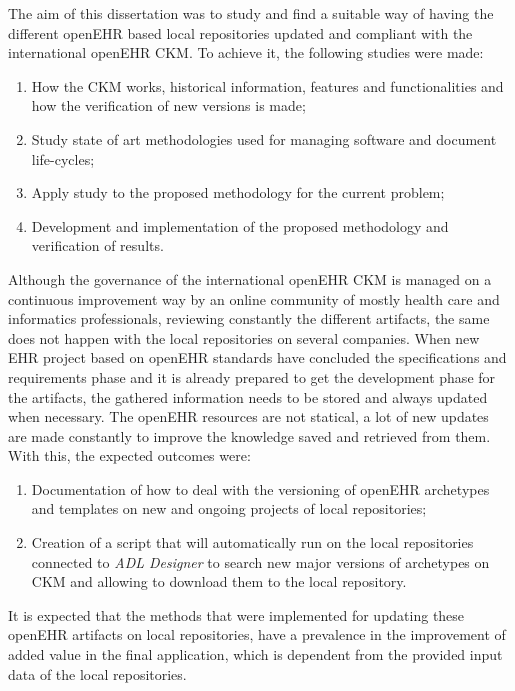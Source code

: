 \documentclass[mim_thesis.tex]{subfiles}
\begin{document}
The aim of this dissertation was to study and find a suitable way of having the different openEHR based local repositories updated and compliant with the international openEHR CKM. To achieve it, the following studies were made:

\begin{enumerate}[noitemsep]
\item How the CKM works, historical information, features and functionalities and how the verification of new versions is made;
\item Study state of art methodologies used for managing software and document life-cycles;
\item Apply study to the proposed methodology for the current problem;
\item Development and implementation of the proposed methodology and verification of results. 
\end{enumerate}

Although the governance of the international openEHR CKM is managed on a continuous improvement way by an online community of mostly health care and informatics professionals, reviewing constantly the different artifacts, the same does not happen with the local repositories on several companies. When new EHR project based on openEHR standards have concluded the specifications and requirements phase and it is already prepared to get the development phase for the artifacts, the gathered information needs to be stored and always updated when necessary. The openEHR resources are not statical, a lot of new updates are made constantly to improve the knowledge saved and retrieved from them. With this, the expected outcomes were:

\begin{enumerate}[noitemsep]
\item Documentation of how to deal with the versioning of openEHR archetypes and templates on new and ongoing projects of local repositories;
\item Creation of a script that will automatically run on the local repositories connected to \textit{ADL Designer} to search new major versions of archetypes on CKM and allowing to download them to the local repository.
\end{enumerate}

It is expected that the methods that were implemented for updating these openEHR artifacts on local repositories, have a prevalence in the improvement of added value in the final application, which is dependent from the provided input data of the local repositories. 
\end{document}

